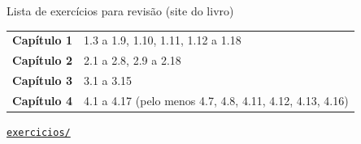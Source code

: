 \documentclass[aspectratio=169,10pt,t]{beamer}
\begin{document}
\begin{frame}{Lista de exercícios para revisão (site do livro)}
  \small
  \begin{tabular}{@{}p{2.4cm}p{9.3cm}@{}}
    \toprule
    \textbf{Capítulo 1} & 1.3 a 1.9, 1.10, 1.11, 1.12 a 1.18\\
    \textbf{Capítulo 2} & 2.1 a 2.8, 2.9 a 2.18\\
    \textbf{Capítulo 3} & 3.1 a 3.15\\
    \textbf{Capítulo 4} & 4.1 a 4.17 (pelo menos 4.7, 4.8, 4.11, 4.12, 4.13, 4.16)\\
    \bottomrule
  \end{tabular}
  \vspace{1ex}

  \href{\siteurl exercicios/}{\texttt{\siteurl exercicios/}}
\end{frame}
\end{document}

